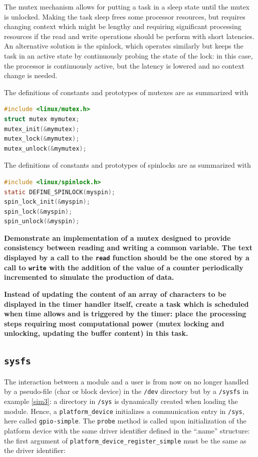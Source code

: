 \documentclass{article}
\begin{document}
{{{The mutex mechanism allows for putting a task in a sleep state until the mutex is unlocked. Making
the task sleep frees some processor resources, but requires changing context which might be 
lengthy and requiring significant processing resources if the read and write operations should be
perform with short latencies. An alternative solution is the spinlock, which operates similarly but
keeps the task in an active state by continuously probing the state of the lock: in this case,
the processor is continuously active, but the latency is lowered and no context change is needed.

The definitions of constants and prototypes of mutexes are as summarized with
\begin{lstlisting}[language=C]
#include <linux/mutex.h>                            
struct mutex mymutex;
mutex_init(&mymutex);
mutex_lock(&mymutex);
mutex_unlock(&mymutex);
\end{lstlisting}

The definitions of constants and prototypes of spinlocks are as summarized with
\begin{lstlisting}[language=C]
#include <linux/spinlock.h>                            
static DEFINE_SPINLOCK(myspin);
spin_lock_init(&myspin);
spin_lock(&myspin);
spin_unlock(&myspin);
\end{lstlisting}

{\bf Demonstrate an implementation of a mutex designed to provide consistency between
reading and writing a common variable. The text displayed by a call to the {\tt read} function
should be the one stored by a call to {\tt write} with the addition of the value of a counter
periodically incremented to simulate the production of data.}

{\bf Instead of updating the content of an array of characters to be displayed in the timer
handler itself, create a task which is scheduled when time allows and is triggered by the timer:
place the processing steps requiring most computational power (mutex locking and unlocking,
updating the buffer content) in this task.}

\subsection{{\tt sysfs}}

The interaction between a module and a user is from now on no longer handled by a
pseudo-file (char or block device) in the {\tt /dev} directory but by a {\tt /sysfs} in
example \ref{sim3}: a directory in {\tt /sys} is dynamically created when loading the module.
Hence, a {\tt platform\_device} initializes a communication entry in {\tt /sys}, here called 
{\tt gpio-simple}. The {\tt probe} method is called upon initialization of the platform
device with the same driver identifier defined in the ``.name'' structure: the first argument
of {\tt platform\_device\_register\_simple} must be the same as the driver identifier:

}}}
\end{document}
